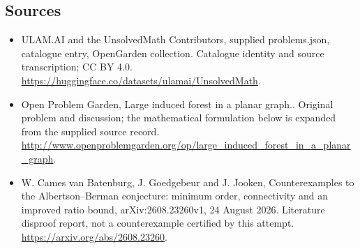 \documentclass[11pt,a4paper]{article}
\begin{document}
\subsection{Sources}
\begin{itemize}
\item[S1] ULAM.AI and the UnsolvedMath Contributors, supplied problems.json, catalogue entry, OpenGarden collection. Catalogue identity and source transcription; CC BY 4.0.
\url{https://huggingface.co/datasets/ulamai/UnsolvedMath}.
\item[S2] Open Problem Garden, Large induced forest in a planar graph.. Original problem and discussion; the mathematical formulation below is expanded from the supplied source record.
\url{http://www.openproblemgarden.org/op/large_induced_forest_in_a_planar_graph}.
\item[S3] W. Cames van Batenburg, J. Goedgebeur and J. Jooken, Counterexamples to the Albertson--Berman conjecture: minimum order, connectivity and an improved ratio bound, arXiv:2608.23260v1, 24 August 2026. Literature disproof report, not a counterexample certified by this attempt.
\url{https://arxiv.org/abs/2608.23260}.
\end{itemize}
\end{document}
